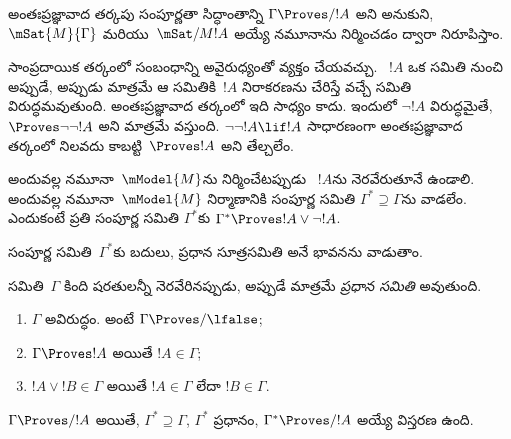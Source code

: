 \documentclass[../../../include/open-logic-section]{subfiles}
\begin{document}


అంతఃప్రజ్ఞావాద తర్కపు సంపూర్ణతా సిద్ధాంతాన్ని
$\Gamma \Proves/ !A$ అని అనుకుని,
$\mSat{M}{\Gamma}$ మరియు~$\mSat/{M}{!A}$
అయ్యే నమూనాను నిర్మించడం ద్వారా నిరూపిస్తాం.

సాంప్రదాయిక తర్కంలో 
సంబంధాన్ని అవైరుధ్యంతో వ్యక్తం చేయవచ్చు.
~$!A$ ఒక
 సమితి నుంచి
 అప్పుడే, అప్పుడు మాత్రమే
ఆ సమితికి~$!A$ నిరాకరణను చేరిస్తే వచ్చే సమితి
విరుద్ధమవుతుంది. అంతఃప్రజ్ఞావాద తర్కంలో
ఇది సాధ్యం కాదు. ఇందులో $\lnot!A$
విరుద్ధమైతే, $\Proves \lnot\lnot !A$
అని మాత్రమే వస్తుంది. $\lnot\lnot!A \lif !A$
సాధారణంగా అంతఃప్రజ్ఞావాద తర్కంలో నిలవదు
కాబట్టి~$\Proves
!A$ అని తేల్చలేం.

అందువల్ల నమూనా~$\mModel{M}$ను నిర్మించేటప్పుడు
~$!A$ను
 నెరవేరుతూనే ఉండాలి.
అందువల్ల నమూనా~$\mModel{M}$ నిర్మాణానికి
సంపూర్ణ సమితి $\Gamma^* \supseteq \Gamma$ను వాడలేం.
ఎందుకంటే ప్రతి సంపూర్ణ సమితి $\Gamma^*$కు
$\Gamma^* \Proves !A \lor \lnot !A$.

సంపూర్ణ సమితి~$\Gamma^*$కు బదులు, ప్రధాన సూత్రసమితి అనే
భావనను వాడుతాం.

\begin{defn}
   సమితి~$\Gamma$
  కింది షరతులన్నీ నెరవేరినప్పుడు, అప్పుడే మాత్రమే
  \emph{ప్రధాన సమితి} అవుతుంది.
  \begin{enumerate}
  \item{} $\Gamma$ అవిరుద్ధం.
    అంటే $\Gamma \Proves/ \lfalse$;
  \item{} $\Gamma \Proves !A$
    అయితే $!A \in \Gamma$;
  \item{} $!A \lor !B \in \Gamma$
    అయితే $!A \in
    \Gamma$ లేదా $!B \in \Gamma$.
  \end{enumerate}
\end{defn}

\begin{lem}[లిండెన్‌బామ్ ఉపప్రమేయం]
   $\Gamma \Proves/ !A$
  అయితే, $\Gamma^* \supseteq \Gamma$,
  $\Gamma^*$ ప్రధానం, $\Gamma^* \Proves/ !A$
అయ్యే విస్తరణ ఉంది.
\end{lem}
\end{document}
